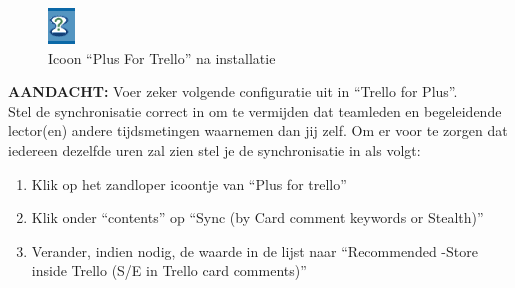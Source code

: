\begin{figure}[h]
	\centering
	\includegraphics[scale=.8]{./afbeeldingen/plusfortrello.png}
	\caption{Icoon ``Plus For Trello'' na installatie}
	\label{fig:plusfortrello}
\end{figure} 
\noindent
\textbf{AANDACHT:} Voer zeker volgende configuratie uit in ``Trello for Plus''. 
\noindent
\\Stel de synchronisatie correct in om te vermijden dat teamleden en begeleidende lector(en) andere tijdsmetingen waarnemen dan jij zelf. Om er voor te zorgen dat iedereen dezelfde uren zal zien stel je de synchronisatie in als volgt:
\begin{enumerate}[nolistsep]
	\item Klik op het zandloper icoontje van ``Plus for trello'' 
	\item Klik onder ``contents'' op ``Sync (by Card comment keywords or Stealth)''
	\item Verander, indien nodig, de waarde in de lijst naar ``Recommended -Store inside Trello (S/E in Trello card comments)'' 
\end{enumerate}


